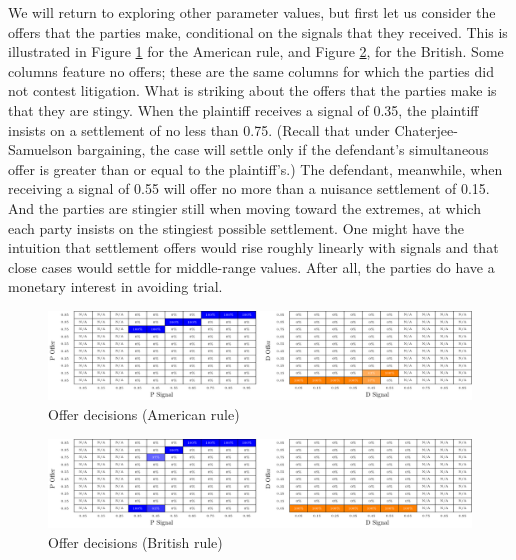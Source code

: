\documentclass{article}
\begin{document}
We will return to exploring other parameter values, but first let us consider the offers that the parties make, conditional on the signals that they received. This is illustrated in Figure \ref{fig:offers_american} for the American rule, and Figure \ref{fig:offers_british}, for the British. Some columns feature no offers; these are the same columns for which the parties did not contest litigation. What is striking about the offers that the parties make is that they are stingy. When the plaintiff receives a signal of 0.35, the plaintiff insists on a settlement of no less than 0.75. (Recall that under Chaterjee-Samuelson bargaining, the case will settle only if the defendant's simultaneous offer is greater than or equal to the plaintiff's.) The defendant, meanwhile, when receiving a signal of 0.55 will offer no more than a nuisance settlement of 0.15. And the parties are stingier still when moving toward the extremes, at which each party insists on the stingiest possible settlement. One might have the intuition that settlement offers would rise roughly linearly with signals and that close cases would settle for middle-range values. After all, the parties do have a monetary interest in avoiding trial. 

\begin{figure}[h!]
\centering
\includegraphics[scale=0.50, trim={0in 0in 0in 0in}, clip]{../Figures/Offers heatmap (American).pdf}
\caption{Offer decisions (American rule)}
\label{fig:offers_american}
\end{figure}

\begin{figure}[h!]
\centering
\includegraphics[scale=0.50, trim={0in 0in 0in 0in}, clip]{../Figures/Offers heatmap (British).pdf}
\caption{Offer decisions (British rule)}
\label{fig:offers_british}
\end{figure}
\end{document}
